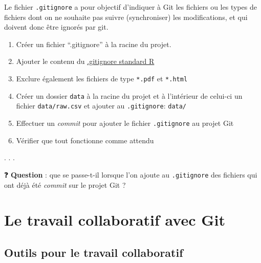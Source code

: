 \documentclass[
  letterpaper,
  DIV=11,
  numbers=noendperiod]{scrartcl}
\providecommand{\tightlist}{%
  \setlength{\itemsep}{0pt}\setlength{\parskip}{0pt}}\usepackage{longtable,booktabs,array}
\begin{document}
\begin{tcolorbox}[enhanced jigsaw, colframe=quarto-callout-tip-color-frame, rightrule=.15mm, breakable, colbacktitle=quarto-callout-tip-color!10!white, coltitle=black, toptitle=1mm, title={Le fichier \texttt{.gitignore}}, titlerule=0mm, leftrule=.75mm, colback=white, bottomrule=.15mm, bottomtitle=1mm, toprule=.15mm, opacitybacktitle=0.6, arc=.35mm, left=2mm, opacityback=0]

Le fichier \texttt{.gitignore} a pour objectif d'indiquer à Git les
fichiers ou les types de fichiers dont on ne souhaite pas suivre
(synchroniser) les modifications, et qui doivent donc être ignorés par
git.

\begin{enumerate}
\def\labelenumi{\arabic{enumi}.}
\tightlist
\item
  Créer un fichier ``.gitignore'' à la racine du projet.
\item
  Ajouter le contenu du
  \href{https://github.com/github/gitignore/blob/main/R.gitignore}{.gitignore
  standard R}
\item
  Exclure également les fichiers de type \texttt{*.pdf} et
  \texttt{*.html}
\item
  Créer un dossier \texttt{data} à la racine du projet et à l'intérieur
  de celui-ci un fichier \texttt{data/raw.csv} et ajouter au
  \texttt{.gitignore}: \texttt{data/}
\item
  Effectuer un \emph{commit} pour ajouter le fichier \texttt{.gitignore}
  au projet Git
\item
  Vérifier que tout fonctionne comme attendu
\end{enumerate}

\end{tcolorbox}

. . .

❓ \textbf{Question} : que se passe-t-il lorsque l'on ajoute au
\texttt{.gitignore} des fichiers qui ont déjà été \emph{commit} sur le
projet Git ?

\hypertarget{le-travail-collaboratif-avec-git}{%
\section{Le travail collaboratif avec
Git}\label{le-travail-collaboratif-avec-git}}

\hypertarget{outils-pour-le-travail-collaboratif}{%
\subsection{Outils pour le travail
collaboratif}\label{outils-pour-le-travail-collaboratif}}
\end{document}
